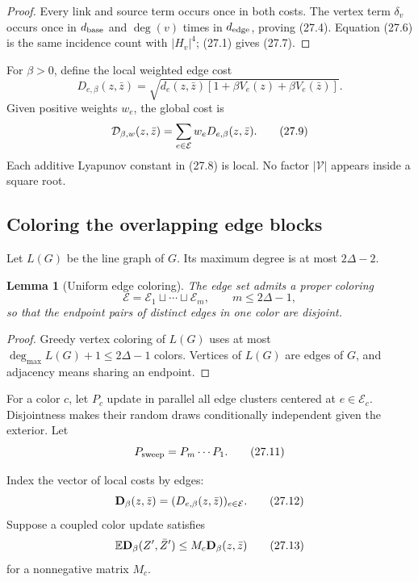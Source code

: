 \documentclass[11pt]{article}
\newtheorem{lemma}[theorem]{Lemma}
\theoremstyle{remark}
\begin{document}
\begin{proof}
Every link and source term occurs once in both costs.  The vertex
term \(\delta_v\) occurs once in \(d_{\rm base}\) and
\(\deg(v)\) times in \(d_{\rm edge}\), proving (27.4).
Equation (27.6) is the same incidence count with \(|H_v|^4\);
(27.1) gives (27.7).
\end{proof}

For \(\beta>0\), define the local weighted edge cost
\[
 D_{e,\beta}(z,\bar z)
 =
 \sqrt{
 d_e(z,\bar z)
 [1+\beta V_e(z)+\beta V_e(\bar z)]
 }.                                                         \tag{27.8}
\]
Given positive weights \(w_e\), the global cost is
\[
 {\cal D}_{\beta,w}(z,\bar z)
 =
 \sum_{e\in\mathcal E}w_eD_{e,\beta}(z,\bar z).             \tag{27.9}
\]
Each additive Lyapunov constant in (27.8) is local.  No factor
\(|\mathcal V|\) appears inside a square root.

\subsection{Coloring the overlapping edge blocks}

Let \(L(G)\) be the line graph of \(G\).  Its maximum degree is at
most \(2\Delta-2\).

\begin{lemma}[Uniform edge coloring]
\label{lem:v15v27-color}
The edge set admits a proper coloring
\[
 \mathcal E=\mathcal E_1\sqcup\cdots\sqcup\mathcal E_m,
 \qquad m\le2\Delta-1,                                     \tag{27.10}
\]
so that the endpoint pairs of distinct edges in one color are
disjoint.
\end{lemma}

\begin{proof}
Greedy vertex coloring of \(L(G)\) uses at most
\(\deg_{\max}L(G)+1\le2\Delta-1\) colors.  Vertices of \(L(G)\)
are edges of \(G\), and adjacency means sharing an endpoint.
\end{proof}

For a color \(c\), let \(P_c\) update in parallel all edge clusters
centered at \(e\in\mathcal E_c\).  Disjointness makes their random
draws conditionally independent given the exterior.  Let
\[
 P_{\rm sweep}=P_m\cdots P_1.                              \tag{27.11}
\]

Index the vector of local costs by edges:
\[
 {\bf D}_\beta(z,\bar z)
 =
 (D_{e,\beta}(z,\bar z))_{e\in\mathcal E}.                 \tag{27.12}
\]
Suppose a coupled color update satisfies
\[
 \mathbb E{\bf D}_\beta(Z',\bar Z')
 \le M_c{\bf D}_\beta(z,\bar z)                            \tag{27.13}
\]
for a nonnegative matrix \(M_c\).
\end{document}
